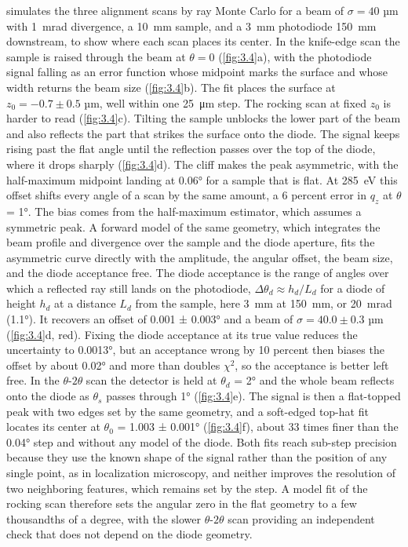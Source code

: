  simulates the three alignment scans by ray Monte Carlo for a beam of \(\sigma = 40\) µm with \qty{1}{mrad} divergence, a \qty{10}{mm} sample, and a \qty{3}{mm} photodiode \qty{150}{mm} downstream, to show where each scan places its center. In the knife-edge scan the sample is raised through the beam at \(\theta = 0\) (\cref{fig:3.4}a), with the photodiode signal falling as an error function whose midpoint marks the surface and whose width returns the beam size (\cref{fig:3.4}b). The fit places the surface at \(z_{0} = - 0.7 \pm 0.5\) µm, well within one \qty{25}{\um} step. The rocking scan at fixed \(z_{0}\) is harder to read (\cref{fig:3.4}c). Tilting the sample unblocks the lower part of the beam and also reflects the part that strikes the surface onto the diode. The signal keeps rising past the flat angle until the reflection passes over the top of the diode, where it drops sharply (\cref{fig:3.4}d). The cliff makes the peak asymmetric, with the half-maximum midpoint landing at \ang{0.06} for a sample that is flat. At \qty{285}{eV} this offset shifts every angle of a scan by the same amount, a 6 percent error in \(q_{z}\) at \(\theta\) = \ang{1}. The bias comes from the half-maximum estimator, which assumes a symmetric peak. A forward model of the same geometry, which integrates the beam profile and divergence over the sample and the diode aperture, fits the asymmetric curve directly with the amplitude, the angular offset, the beam size, and the diode acceptance free. The diode acceptance is the range of angles over which a reflected ray still lands on the photodiode, \(\Delta\theta_{d} \approx h_{d}/L_{d}\) for a diode of height \(h_{d}\) at a distance \(L_{d}\) from the sample, here \qty{3}{mm} at \qty{150}{mm}, or \qty{20}{mrad} (\ang{1.1}). It recovers an offset of 0.001 ± \ang{0.003} and a beam of \(\sigma = 40.0 \pm 0.3\) µm (\cref{fig:3.4}d, red). Fixing the diode acceptance at its true value reduces the uncertainty to \ang{0.0013}, but an acceptance wrong by 10 percent then biases the offset by about \ang{0.02} and more than doubles \(\chi^{2}\), so the acceptance is better left free. In the \(\theta\)-\(2\theta\) scan the detector is held at \(\theta_{d}\) = \ang{2} and the whole beam reflects onto the diode as \(\theta_{s}\) passes through \ang{1} (\cref{fig:3.4}e). The signal is then a flat-topped peak with two edges set by the same geometry, and a soft-edged top-hat fit locates its center at \(\theta_{0}\) = 1.003 ± \ang{0.001} (\cref{fig:3.4}f), about 33 times finer than the \ang{0.04} step and without any model of the diode. Both fits reach sub-step precision because they use the known shape of the signal rather than the position of any single point, as in localization microscopy,\autocite{thompsonPreciseNanometerLocalization2002} and neither improves the resolution of two neighboring features, which remains set by the step. A model fit of the rocking scan therefore sets the angular zero in the flat geometry to a few thousandths of a degree, with the slower \(\theta\)-\(2\theta\) scan providing an independent check that does not depend on the diode geometry.

